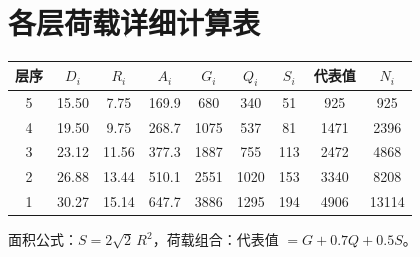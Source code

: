 \documentclass[12pt,a4paper,UTF8]{ctexart}
\begin{document}
\section{各层荷载详细计算表}
\label{app:B}

\begin{center}
    \footnotesize
    \begin{tabular}{ccccccccc}
        \toprule
        层序 & $D_i$ & $R_i$ & $A_i$ & $G_i$ & $Q_i$ & $S_i$ & 代表值  & $N_i$ \\
        \midrule
        5  & 15.50 & 7.75  & 169.9 & 680   & 340   & 51    & 925  & 925   \\
        4  & 19.50 & 9.75  & 268.7 & 1075  & 537   & 81    & 1471 & 2396  \\
        3  & 23.12 & 11.56 & 377.3 & 1887  & 755   & 113   & 2472 & 4868  \\
        2  & 26.88 & 13.44 & 510.1 & 2551  & 1020  & 153   & 3340 & 8208  \\
        1  & 30.27 & 15.14 & 647.7 & 3886  & 1295  & 194   & 4906 & 13114 \\
        \bottomrule
    \end{tabular}
\end{center}

面积公式：$S = 2\sqrt{2}\, R^2$，荷载组合：代表值 $= G + 0.7Q + 0.5S$。
\end{document}
